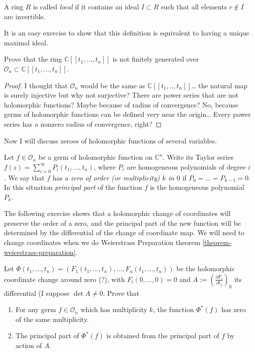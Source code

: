 \begin{definition}
\label{definition-local-ring}
A ring $R$ is called {\it local} if it contains an ideal $I\subset R$ such that
all elements $r \not \in I$ are invertible.
\end{definition}

It is an easy exercise to show that this definition is equivalent to having a
unique maximal ideal.

\begin{exercise}
\label{exercise-power-series-is-not-finitely-generated-over-stalk}
Prove that the ring $\mathbb{C}[\![ t_1,\ldots,t_n]\!]$ is not
finitely generated over $\mathcal{O}_n \subset 
\mathbb{C}[\![ t_1,\ldots,t_n]\!]$.
\end{exercise}

\begin{proof}
I thought that $\mathcal{O}_n$ would be the same as 
$\mathbb{C}[\![ t_1,..,t_n]\!]$… the natural map is surely injective
but why not surjective? There are power series that are not holomorphic
functions? Maybe because of radius of convergence? No, because germs of
holomorphic functions can be defined very near the origin… Every power series
has a nonzero radius of convergence, right?
\end{proof}

\noindent
Now I will discuss zeroes of holomorphic functions of several variables.

\begin{definition}
\label{definition-zero-of-holomorphic-function-of-several-variables}
Let  $f\in \mathcal{O}_n$ be a germ of holomorphic function on $\mathbb{C}^n$.
Write its Taylor series $f(z)=\sum_{i=0}^\infty P_i(t_1,\ldots,t_n)$, where
$P_i$ are homogeneous polynomials of degree $i$. We say that $f$ has a {\it
zero of order (or multiplicity) $k$ in $0$} if $P_0=\ldots=P_{k-1}=0$. In this
situation {\it principal part} of the function $f$ is the homogeneous polynomial
$P_k$.
\end{definition}

The following exercise shows that a holomorphic change of coordinates will
preserve the order of a zero, and the principal part of the new function will be
determined by the differential of the change of coordinate map. We will need to
change coordinates when we do Weierstrass Preparation theorem
\ref{theorem-weierstrass-preparation}.

\begin{exercise}
\label{exercise-principal-part-under-coordinate-change}
Let $\Phi(t_1,\ldots,t_n)=(F_1(t_1,\ldots,t_n),\ldots,F_n(t_1,\ldots,t_n))$ be
the holomorphic coordinate change around zero (?), with $F_i(0,\ldots,0)=0$ and
$A:=\left(\frac{\partial F_i}{\partial t_j}\right)_0$ its differential (I suppose
$\det A \neq 0$. Prove that
\begin{enumerate}
\item For any germ $f\in \mathcal{O}_n$ which has multiplicity $k$, the function
$\Phi^*(f)$ has zero of the same multiplicity.
\item The principal part of $\Phi^*(f)$ is obtained from the principal part of
$f$ by action of $A$.
\end{enumerate}
\end{exercise}

